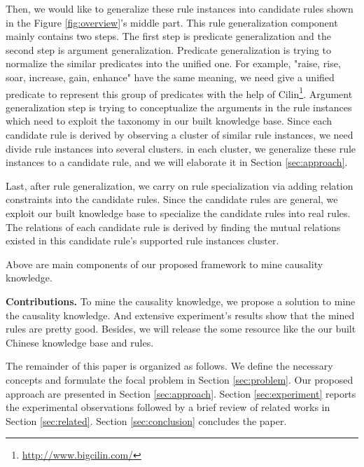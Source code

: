 Then, we would like to generalize these rule instances into candidate rules shown in the Figure \ref{fig:overview}'s middle part. This rule generalization component mainly contains two steps. The first step is predicate generalization and the second step is argument generalization. Predicate generalization is trying to normalize the similar predicates into the unified one. For example, "raise, rise, soar, increase, gain, enhance" have the same meaning, we need give a unified predicate to represent this group of predicates with the help of Cilin\footnote{ \url{ http://www.bigcilin.com/}}. Argument generalization step is trying to conceptualize the arguments in the rule instances which need to exploit the taxonomy in our built knowledge base. Since each candidate rule is derived by observing a cluster of similar rule instances, we need divide rule instances into several clusters. in each cluster, we generalize these rule instances to a candidate rule, and we will elaborate it in Section \ref{sec:approach}.         

Last, after rule generalization, we carry on rule specialization via adding relation constraints into the candidate rules. Since the candidate rules are general, we exploit our built knowledge base to specialize the candidate rules into real rules. The relations of each candidate rule is derived by finding the mutual relations existed in this candidate rule's supported rule instances cluster.


Above are main components of our proposed framework to mine causality knowledge.

\textbf{Contributions.}
To mine the causality knowledge, we propose a solution to mine the causality knowledge. And extensive experiment's results show that the mined rules are pretty good. Besides, we will release the some resource like the our built Chinese  knowledge base and rules.

The remainder of this paper is organized as follows. We define the necessary concepts and formulate the focal problem in Section \ref{sec:problem}. Our proposed approach are presented in Section \ref{sec:approach}. Section \ref{sec:experiment} reports the experimental observations followed by a brief review of related works in Section \ref{sec:related}. Section \ref{sec:conclusion} concludes the paper.
 
